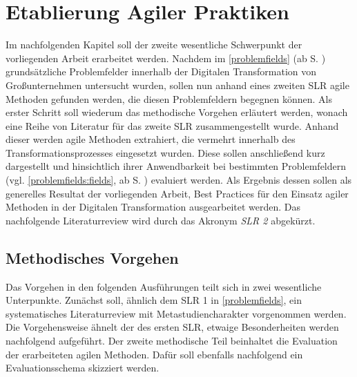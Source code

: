 \chapter{Etablierung Agiler Praktiken}
\label{agilepractices}


Im nachfolgenden Kapitel soll der zweite wesentliche Schwerpunkt der vorliegenden Arbeit erarbeitet werden. Nachdem im \ref{problemfields} (ab S. \pageref{problemfields}) grundsätzliche Problemfelder innerhalb der Digitalen Transformation von Großunternehmen untersucht wurden, sollen nun anhand eines zweiten SLR agile Methoden gefunden werden, die diesen Problemfeldern begegnen können. Als erster Schritt soll wiederum das methodische Vorgehen erläutert werden, wonach eine Reihe von Literatur für das zweite SLR zusammengestellt wurde. Anhand dieser werden agile Methoden extrahiert, die vermehrt innerhalb des Transformationsprozesses eingesetzt wurden. Diese sollen anschließend kurz dargestellt und hinsichtlich ihrer Anwendbarkeit bei bestimmten Problemfeldern (vgl. \ref{problemfields:fields}, ab S. \pageref{problemfields:fields}) evaluiert werden. Als Ergebnis dessen sollen als generelles Resultat der vorliegenden Arbeit, Best Practices für den Einsatz agiler Methoden in der Digitalen Transformation ausgearbeitet werden. Das nachfolgende Literaturreview wird durch das Akronym \textit{SLR 2} abgekürzt.

\section{Methodisches Vorgehen}
\label{agilepractices:methods}


Das Vorgehen in den folgenden Ausführungen teilt sich in zwei wesentliche Unterpunkte. Zunächst soll, ähnlich dem SLR 1 in \ref{problemfields}, ein systematisches Literaturreview mit Metastudiencharakter vorgenommen werden. Die Vorgehensweise ähnelt der des ersten SLR, etwaige Besonderheiten werden nachfolgend aufgeführt. Der zweite  methodische Teil beinhaltet die Evaluation der erarbeiteten agilen Methoden. Dafür soll ebenfalls nachfolgend ein Evaluationsschema skizziert werden.


